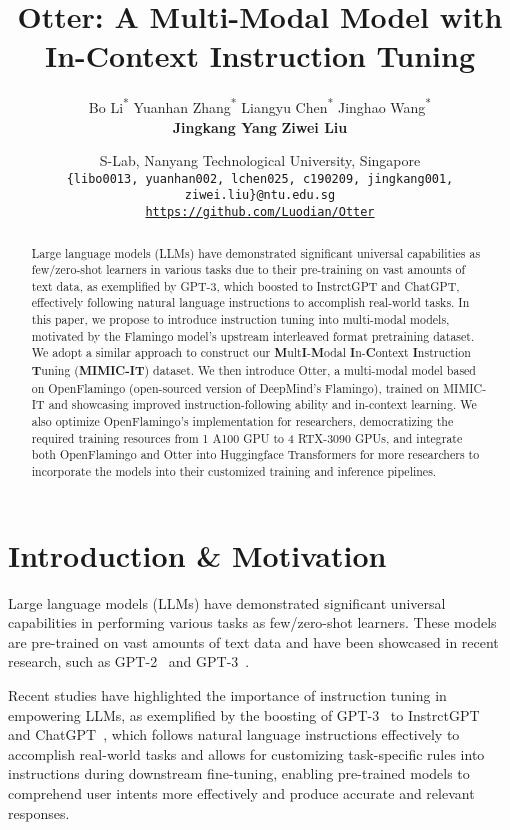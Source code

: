 \documentclass{article}
\title{Otter: A Multi-Modal Model with In-Context Instruction Tuning}
\author{
Bo Li\textsuperscript{*} \quad Yuanhan Zhang\textsuperscript{*} \quad Liangyu Chen\textsuperscript{*} \quad Jinghao Wang\textsuperscript{*} \\
\textbf{Jingkang Yang} \quad \textbf{Ziwei Liu}\textsuperscript{\Letter}
\and
S-Lab, Nanyang Technological University, Singapore\\
{\tt\small\{libo0013, yuanhan002, lchen025, c190209, jingkang001, ziwei.liu\}@ntu.edu.sg}\\
{\tt\small\url{https://github.com/Luodian/Otter}}
}
\begin{document}
\maketitle
\def\thefootnote{*}\def\thefootnote{\arabic{footnote}}
\def\thefootnote{\Letter}\def\thefootnote{\arabic{footnote}}
\begin{abstract}
Large language models (LLMs) have demonstrated significant universal capabilities as few/zero-shot learners in various tasks due to their pre-training on vast amounts of text data, as exemplified by GPT-3, which boosted to InstrctGPT and ChatGPT, effectively following natural language instructions to accomplish real-world tasks. In this paper, we propose to introduce instruction tuning into multi-modal models, motivated by the Flamingo model's upstream interleaved format pretraining dataset. We adopt a similar approach to construct our \textbf{M}ult\textbf{I}-\textbf{M}odal \textbf{I}n-\textbf{C}ontext \textbf{I}nstruction \textbf{T}uning (\textbf{MIMIC-IT}) dataset. We then introduce Otter, a multi-modal model based on OpenFlamingo (open-sourced version of DeepMind's Flamingo), trained on MIMIC-IT and showcasing improved instruction-following ability and in-context learning. We also optimize OpenFlamingo's implementation for researchers, democratizing the required training resources from 1 A100 GPU to 4 RTX-3090 GPUs, and integrate both OpenFlamingo and Otter into Huggingface Transformers for more researchers to incorporate the models into their customized training and inference pipelines.

\end{abstract}

\section{Introduction \& Motivation}





Large language models (LLMs) have demonstrated significant universal capabilities in performing various tasks as few/zero-shot learners. These models are pre-trained on vast amounts of text data and have been showcased in recent research, such as GPT-2~\cite{gpt2} and GPT-3~\cite{gpt3}. 

Recent studies have highlighted the importance of instruction tuning in empowering LLMs, as exemplified by the boosting of GPT-3~\cite{gpt3} to InstrctGPT~\cite{instruct_gpt} and ChatGPT~\cite{chatgpt}, which follows natural language instructions effectively to accomplish real-world tasks and allows for customizing task-specific rules into instructions during downstream fine-tuning, enabling pre-trained models to comprehend user intents more effectively and produce accurate and relevant responses.
\end{document}
